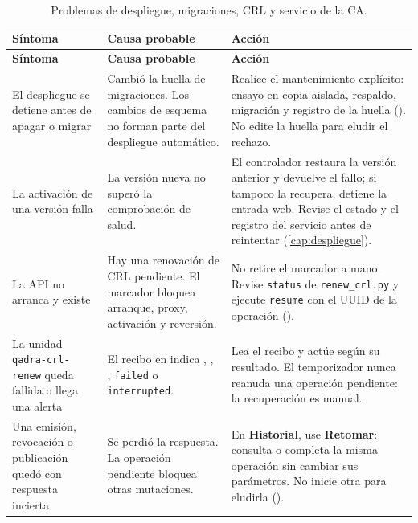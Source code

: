 {\small
\begin{longtable}{L{3.7cm} L{4.6cm} L{7.1cm}}
  \caption{Problemas de despliegue, migraciones, CRL y servicio de la CA.}\label{tab:prob-despliegue} \\
  \toprule
  \textbf{Síntoma} & \textbf{Causa probable} & \textbf{Acción} \\
  \midrule
  \endfirsthead
  \toprule
  \textbf{Síntoma} & \textbf{Causa probable} & \textbf{Acción} \\
  \midrule
  \endhead
  \bottomrule
  \endfoot
    El despliegue se detiene antes de apagar o migrar
      & Cambió la huella de migraciones. Los cambios de esquema no forman
        parte del despliegue automático.
      & Realice el mantenimiento explícito: ensayo en copia aislada,
        respaldo, migración y registro de la huella
        (). No edite la huella para
        eludir el rechazo. \\
    La activación de una versión falla
      & La versión nueva no superó la comprobación de salud.
      & El controlador restaura la versión anterior y devuelve el fallo; si
        tampoco la recupera, detiene la entrada web. Revise el estado y el
        registro del servicio antes de reintentar (\cref{cap:despliegue}). \\
    La API no arranca y existe 
      & Hay una renovación de CRL pendiente. El marcador bloquea arranque,
        proxy, activación y reversión.
      & No retire el marcador a mano. Revise \texttt{status} de
        \texttt{renew\_crl.py} y ejecute \texttt{resume} con el UUID de la
        operación (). \\
    La unidad \texttt{qadra-crl-renew} queda fallida o llega una alerta
      & El recibo en  indica
        , , ,
        \texttt{failed} o \texttt{interrupted}.
      & Lea el recibo y actúe según su resultado. El temporizador nunca reanuda una
        operación pendiente: la recuperación es manual. \\
    Una emisión, revocación o publicación quedó con respuesta incierta
      & Se perdió la respuesta. La operación pendiente bloquea otras
        mutaciones.
      & En \textbf{Historial}, use \textbf{Retomar}: consulta o completa la
        misma operación sin cambiar sus parámetros. No inicie otra para
        eludirla (). \\

\end{longtable}}
